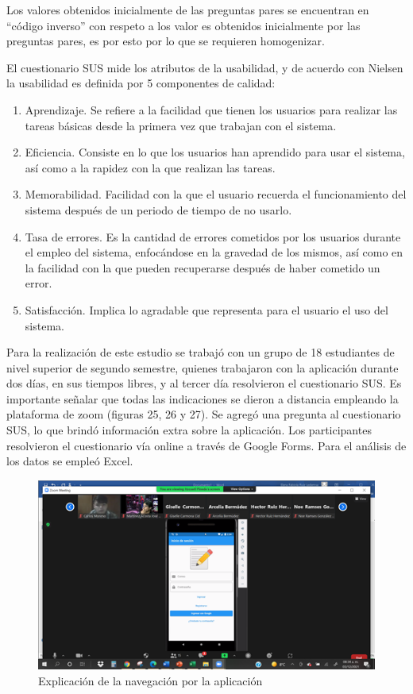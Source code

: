 \documentclass{article}
\begin{document}
Los valores obtenidos inicialmente de las preguntas pares se encuentran en “código inverso” 
con respeto a los valor	es obtenidos inicialmente por las preguntas pares, es por esto por 
lo que se requieren homogenizar. 

El cuestionario SUS mide los atributos de la usabilidad, y de acuerdo con Nielsen \cite{nielsen1994usability}
la usabilidad es definida por 5 componentes de calidad: 

\begin{enumerate}
\item Aprendizaje. Se refiere a la facilidad que tienen los usuarios para realizar las 
tareas básicas desde la primera vez que trabajan con el sistema. 
\item Eficiencia. Consiste en lo que los usuarios han aprendido para usar el sistema, 
así como a la rapidez con la que realizan las tareas. 
\item Memorabilidad. Facilidad con la que el usuario recuerda el funcionamiento del 
sistema después de un periodo de tiempo de no usarlo.
\item Tasa de errores. Es la cantidad de errores cometidos por los usuarios durante 
el empleo del sistema, enfocándose en la gravedad de los mismos, así como en la 
facilidad con la que pueden recuperarse después de haber cometido un error.
\item Satisfacción. Implica lo agradable que representa para el usuario el uso del 
sistema.
\end{enumerate}

Para la realización de este estudio se trabajó con un grupo de 18 estudiantes de nivel 
superior de segundo semestre, quienes trabajaron con la aplicación durante dos días, 
en sus tiempos libres, y al tercer día resolvieron el cuestionario SUS. Es importante 
señalar que todas las indicaciones se dieron a distancia empleando la plataforma de 
zoom (figuras 25, 26 y 27). Se agregó una pregunta al cuestionario SUS, lo que brindó 
información extra sobre la aplicación. Los participantes resolvieron el cuestionario 
vía online a través de Google Forms. Para el análisis de los datos se empleó Excel. 


\begin{figure}[H]
    \centering
    \includegraphics[scale=0.7]{imgs/pruebas/pruebas_01.png}
    \caption{Explicación de la navegación por la aplicación}
\end{figure}
\end{document}

